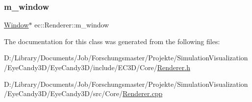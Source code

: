 \mbox{\label{classec_1_1_renderer_ac23d74f9d295bf833f095bdff8c8169b}} 
\subsubsection{\texorpdfstring{m\+\_\+window}{m\_window}}
{\footnotesize\ttfamily \mbox{\hyperlink{classec_1_1_window}{Window}}$\ast$ ec\+::\+Renderer\+::m\+\_\+window\hspace{0.3cm}{\ttfamily [protected]}}



The documentation for this class was generated from the following files\+:\begin{DoxyCompactItemize}
\item 
D\+:/\+Library/\+Documents/\+Job/\+Forschungsmaster/\+Projekte/\+Simulation\+Visualization/\+Eye\+Candy3\+D/\+Eye\+Candy3\+D/include/\+E\+C3\+D/\+Core/\mbox{\hyperlink{_renderer_8h}{Renderer.\+h}}\item 
D\+:/\+Library/\+Documents/\+Job/\+Forschungsmaster/\+Projekte/\+Simulation\+Visualization/\+Eye\+Candy3\+D/\+Eye\+Candy3\+D/src/\+Core/\mbox{\hyperlink{_renderer_8cpp}{Renderer.\+cpp}}\end{DoxyCompactItemize}
